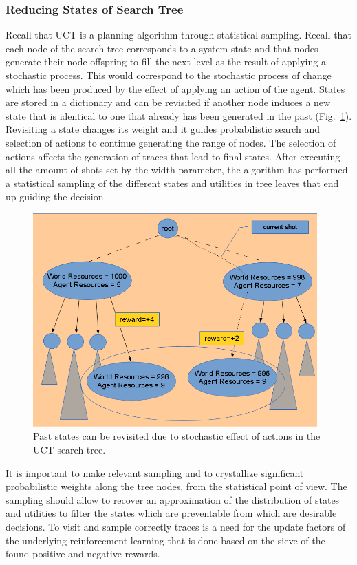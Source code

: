 \documentclass[11pt,oneside,a4paper,openright]{report}
\begin{document}
\subsubsection{Reducing States of Search Tree}
\label{sec:ReduccStates}

Recall that UCT is a planning algorithm through statistical sampling. Recall that each node of the search tree corresponds to a system state and that nodes generate their node offspring to fill the next level as the result of applying a stochastic process. This would correspond to the stochastic process of change which has been produced by the effect of applying an action of the agent. States are stored in a dictionary and can be revisited if another node induces a new state that is identical to one that already has been generated in the past (Fig.~\ref{fig:reducc1}). Revisiting a state changes its weight and it guides probabilistic search and selection of actions to continue generating the range of nodes. The selection of actions affects the generation of traces that lead to final states. After executing all the amount of shots  set by the width parameter, the algorithm has performed a statistical sampling of the different states and utilities in tree leaves that end up guiding the decision.

\begin{figure}[!htb]
\centering
\includegraphics[height=8.2cm]{figures/diagram/reducc1}
\caption{Past states can be revisited due to stochastic effect of actions in the UCT search tree.}
\label{fig:reducc1}
\end{figure}

It is important to make relevant sampling and to crystallize significant probabilistic weights along the tree nodes, from the statistical point of view. The sampling should allow to recover an approximation of the distribution of states and utilities to filter the states which are preventable from which are desirable decisions. To visit and sample correctly traces is a need for the update factors of the underlying reinforcement learning that is done based on the sieve of the found positive and negative rewards.
\end{document}
